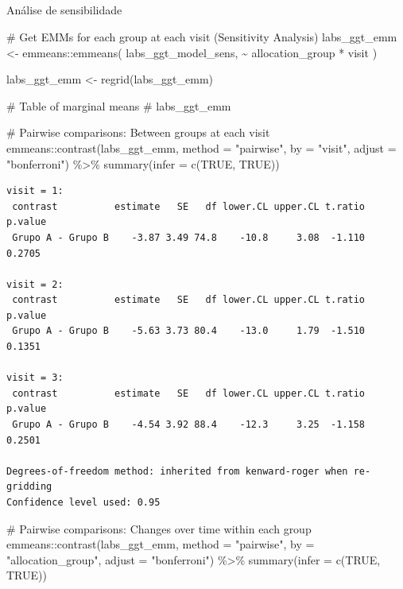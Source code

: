\documentclass[
  12pt,
]{article}
\makeatletter
\let\oldsubparagraph\subparagraph
\renewcommand{\subparagraph}{
    \@ifstar
      \xxxSubParagraphStar
      \xxxSubParagraphNoStar
  }
\newcommand{\xxxSubParagraphStar}[1]{\oldsubparagraph*{#1}\mbox{}}
\newcommand{\xxxSubParagraphNoStar}[1]{\oldsubparagraph{#1}\mbox{}}
\newenvironment{Shaded}{\begin{snugshade}}{\end{snugshade}}
\newcommand{\AttributeTok}[1]{\textcolor[rgb]{0.40,0.45,0.13}{#1}}
\newcommand{\CommentTok}[1]{\textcolor[rgb]{0.37,0.37,0.37}{#1}}
\newcommand{\ConstantTok}[1]{\textcolor[rgb]{0.56,0.35,0.01}{#1}}
\newcommand{\FunctionTok}[1]{\textcolor[rgb]{0.28,0.35,0.67}{#1}}
\newcommand{\NormalTok}[1]{\textcolor[rgb]{0.00,0.23,0.31}{#1}}
\newcommand{\OtherTok}[1]{\textcolor[rgb]{0.00,0.23,0.31}{#1}}
\newcommand{\SpecialCharTok}[1]{\textcolor[rgb]{0.37,0.37,0.37}{#1}}
\newcommand{\StringTok}[1]{\textcolor[rgb]{0.13,0.47,0.30}{#1}}
\makeatother
\begin{document}
\subparagraph{Análise de
sensibilidade}\label{anuxe1lise-de-sensibilidade-2}

\begin{Shaded}
\begin{Highlighting}[]
\CommentTok{\# Get EMMs for each group at each visit (Sensitivity Analysis)}
\NormalTok{labs\_ggt\_emm }\OtherTok{\textless{}{-}}\NormalTok{ emmeans}\SpecialCharTok{::}\FunctionTok{emmeans}\NormalTok{(}
\NormalTok{    labs\_ggt\_model\_sens, }
    \SpecialCharTok{\textasciitilde{}}\NormalTok{ allocation\_group }\SpecialCharTok{*}\NormalTok{ visit}
\NormalTok{)}

\NormalTok{labs\_ggt\_emm }\OtherTok{\textless{}{-}} \FunctionTok{regrid}\NormalTok{(labs\_ggt\_emm)}

\CommentTok{\# Table of marginal means}
\CommentTok{\# labs\_ggt\_emm}

\CommentTok{\# Pairwise comparisons: Between groups at each visit}
\NormalTok{emmeans}\SpecialCharTok{::}\FunctionTok{contrast}\NormalTok{(labs\_ggt\_emm,}
\AttributeTok{method =} \StringTok{"pairwise"}\NormalTok{, }\AttributeTok{by =} \StringTok{"visit"}\NormalTok{,}
\AttributeTok{adjust =} \StringTok{"bonferroni"}\NormalTok{) }\SpecialCharTok{\%\textgreater{}\%} \FunctionTok{summary}\NormalTok{(}\AttributeTok{infer =} \FunctionTok{c}\NormalTok{(}\ConstantTok{TRUE}\NormalTok{, }\ConstantTok{TRUE}\NormalTok{))}
\end{Highlighting}
\end{Shaded}

\begin{verbatim}
visit = 1:
 contrast          estimate   SE   df lower.CL upper.CL t.ratio p.value
 Grupo A - Grupo B    -3.87 3.49 74.8    -10.8     3.08  -1.110  0.2705

visit = 2:
 contrast          estimate   SE   df lower.CL upper.CL t.ratio p.value
 Grupo A - Grupo B    -5.63 3.73 80.4    -13.0     1.79  -1.510  0.1351

visit = 3:
 contrast          estimate   SE   df lower.CL upper.CL t.ratio p.value
 Grupo A - Grupo B    -4.54 3.92 88.4    -12.3     3.25  -1.158  0.2501

Degrees-of-freedom method: inherited from kenward-roger when re-gridding 
Confidence level used: 0.95 
\end{verbatim}

\begin{Shaded}
\begin{Highlighting}[]
\CommentTok{\# Pairwise comparisons: Changes over time within each group}
\NormalTok{emmeans}\SpecialCharTok{::}\FunctionTok{contrast}\NormalTok{(labs\_ggt\_emm,}
\AttributeTok{method =} \StringTok{"pairwise"}\NormalTok{, }\AttributeTok{by =} \StringTok{"allocation\_group"}\NormalTok{,}
\AttributeTok{adjust =} \StringTok{"bonferroni"}\NormalTok{) }\SpecialCharTok{\%\textgreater{}\%} \FunctionTok{summary}\NormalTok{(}\AttributeTok{infer =} \FunctionTok{c}\NormalTok{(}\ConstantTok{TRUE}\NormalTok{, }\ConstantTok{TRUE}\NormalTok{))}
\end{Highlighting}
\end{Shaded}
\end{document}

